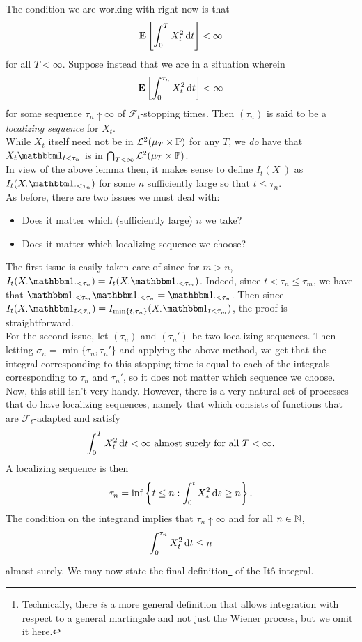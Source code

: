 The condition we are working with right now is that
\[ \textbf{E}\left[\int_0^T X_t^2 \operatorname{d}\!{t} \right] < \infty \]
for all $T<\infty$. Suppose instead that we are in a situation wherein
\[ \textbf{E}\left[\int_0^{\tau_n} X_t^2 \operatorname{d}\!{t} \right] < \infty \]
for some sequence $\tau_n\uparrow\infty$ of $\mathcal{F}_t$-stopping times. Then $(\tau_n)$ is said to be a \textit{localizing sequence} for $X_t$.\\
While $X_t$ itself need not be in $\mathcal{L}^2(\mu_T\times\mathbb{P})$ for any $T$, we \textit{do} have that $X_t\indic_{t<\tau_n}$ is in $\bigcap_{T<\infty}\mathcal{L}^2(\mu_T\times\mathbb{P})$.\\
In view of the above lemma then, it makes sense to define $I_t(X_\cdot)$ as $I_t(X_\cdot\indic_{\cdot<\tau_n})$ for some $n$ sufficiently large so that $t\leq\tau_n$.\\
As before, there are two issues we must deal with:
\begin{itemize}
	\item Does it matter which (sufficiently large) $n$ we take?
	\item Does it matter which localizing sequence we choose?
\end{itemize}

The first issue is easily taken care of since for $m>n$, $I_t(X_\cdot \indic_{\cdot < \tau_n}) = I_t(X_\cdot \indic_{\cdot < \tau_m})$. Indeed, since $t<\tau_n\leq\tau_m$, we have that $\indic_{\cdot<\tau_m}\indic_{\cdot<\tau_n} = \indic_{\cdot<\tau_n}$. Then since $I_t(X_\cdot\indic_{t<\tau_n}) = I_{\min\{t,\tau_n\}}(X_\cdot\indic_{t<\tau_m})$, the proof is straightforward.\\

For the second issue, let $(\tau_n)$ and $(\tau_n')$ be two localizing sequences. Then letting $\sigma_n = \min\{\tau_n,\tau_n'\}$ and applying the above method, we get that the integral corresponding to this stopping time is equal to each of the integrals corresponding to $\tau_n$ and $\tau_n'$, so it does not matter which sequence we choose.\\

Now, this still isn't very handy. However, there is a very natural set of processes that do have localizing sequences, namely that which consists of functions that are $\mathcal{F}_t$-adapted and satisfy
\[ \int_0^T X_t^2\operatorname{d}\!{t} < \infty \text{ almost surely for all } T<\infty. \]
A localizing sequence is then
\[ \tau_n = \inf\left\{t\leq n : \int_0^t X_s^2\operatorname{d}\!{s} \geq n \right\}. \]
The condition on the integrand implies that $\tau_n\uparrow\infty$ and for all $n\in\mathbb{N}$,
\[ \int_0^{\tau_n} X_t^2\operatorname{d}\!{t} \leq n \]
almost surely. We may now state the final definition\footnote{Technically, there \textit{is} a more general definition that allows integration with respect to a general martingale and not just the Wiener process, but we omit it here.} of the It\^{o} integral.

